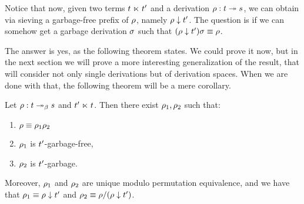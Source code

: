 Notice that now, given two terms $t \mathrel{\ltimes} t'$ and a derivation
$\rho : t \mathrel{\twoheadrightarrow} s$, we can obtain via sieving a garbage-free prefix
of $\rho$, namely $\rho \downarrow t'$.
The question is if we can somehow get a garbage derivation $\sigma$ such that
$(\rho \downarrow t') \sigma \equiv \rho$.

The answer is yes, as the following theorem states.
We could prove it now, but in the next section we will
prove a more interesting generalization of the result,
that will consider not only single derivations
but of derivation spaces.
When we are done with that, the following theorem will be a mere corollary.


\begin{theorem}
Let $\rho : t \mathrel{\twoheadrightarrow_\beta} s$ and $t' \mathrel{\ltimes} t$.
Then there exist $\rho_1,\rho_2$ such that:
\begin{enumerate}
\item $\rho \equiv \rho_1\rho_2$
\item $\rho_1$ is $t'$-garbage-free,
\item $\rho_2$ is $t'$-garbage.
\end{enumerate}
Moreover, $\rho_1$ and $\rho_2$ are unique modulo permutation equivalence,
and we have that
$\rho_1 \equiv \rho \downarrow t'$ and $\rho_2 \equiv \rho/(\rho \downarrow t')$.
\end{theorem}
